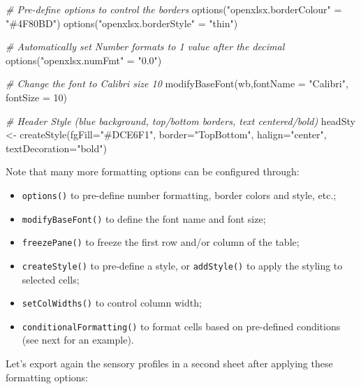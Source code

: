 \documentclass[
]{krantz}
\makeatletter
\newenvironment{Shaded}{\begin{snugshade}}{\end{snugshade}}
\newcommand{\AttributeTok}[1]{\textcolor[rgb]{0.61,0.61,0.61}{#1}}
\newcommand{\CommentTok}[1]{\textcolor[rgb]{0.37,0.37,0.37}{\textit{#1}}}
\newcommand{\DecValTok}[1]{\textcolor[rgb]{0.06,0.06,0.06}{#1}}
\newcommand{\FunctionTok}[1]{\textcolor[rgb]{0,0,0}{#1}}
\newcommand{\NormalTok}[1]{#1}
\newcommand{\OtherTok}[1]{\textcolor[rgb]{0.37,0.37,0.37}{#1}}
\newcommand{\StringTok}[1]{\textcolor[rgb]{0.5,0.5,0.5}{#1}}
\providecommand{\tightlist}{%
  \setlength{\itemsep}{0pt}\setlength{\parskip}{0pt}}
\newenvironment{kframe}{%
\medskip{}
\setlength{\fboxsep}{.8em}
 \def\at@end@of@kframe{}%
 \ifinner\ifhmode%
  \def\at@end@of@kframe{\end{minipage}}%
  \begin{minipage}{\columnwidth}%
 \fi\fi%
 \def\FrameCommand##1{\hskip\@totalleftmargin \hskip-\fboxsep
 \colorbox{shadecolor}{##1}\hskip-\fboxsep
     \hskip-\linewidth \hskip-\@totalleftmargin \hskip\columnwidth}%
 \MakeFramed {\advance\hsize-\width
   \@totalleftmargin\z@ \linewidth\hsize
   \@setminipage}}%
 {\par\unskip\endMakeFramed%
 \at@end@of@kframe}
\renewenvironment{Shaded}{\begin{kframe}}{\end{kframe}}
\makeatother
\begin{document}
\begin{Shaded}
\begin{Highlighting}[]
\CommentTok{\# Pre{-}define options to control the borders }
\FunctionTok{options}\NormalTok{(}\StringTok{"openxlsx.borderColour"} \OtherTok{=} \StringTok{"\#4F80BD"}\NormalTok{)}
\FunctionTok{options}\NormalTok{(}\StringTok{"openxlsx.borderStyle"} \OtherTok{=} \StringTok{"thin"}\NormalTok{)}

\CommentTok{\# Automatically set Number formats to 1 value after the decimal}
\FunctionTok{options}\NormalTok{(}\StringTok{"openxlsx.numFmt"} \OtherTok{=} \StringTok{"0.0"}\NormalTok{)}

\CommentTok{\# Change the font to Calibri size 10}
\FunctionTok{modifyBaseFont}\NormalTok{(wb,}\AttributeTok{fontName =} \StringTok{"Calibri"}\NormalTok{, }\AttributeTok{fontSize =} \DecValTok{10}\NormalTok{)}

\CommentTok{\# Header Style (blue background, top/bottom borders, text centered/bold)}
\NormalTok{headSty }\OtherTok{\textless{}{-}} \FunctionTok{createStyle}\NormalTok{(}\AttributeTok{fgFill=}\StringTok{"\#DCE6F1"}\NormalTok{, }\AttributeTok{border=}\StringTok{"TopBottom"}\NormalTok{, }\AttributeTok{halign=}\StringTok{"center"}\NormalTok{, }\AttributeTok{textDecoration=}\StringTok{"bold"}\NormalTok{)}
\end{Highlighting}
\end{Shaded}

Note that many more formatting options can be configured through:

\begin{itemize}
\tightlist
\item
  \texttt{options()} to pre-define number formatting, border colors and style, etc.;
\item
  \texttt{modifyBaseFont()} to define the font name and font size;
\item
  \texttt{freezePane()} to freeze the first row and/or column of the table;
\item
  \texttt{createStyle()} to pre-define a style, or \texttt{addStyle()} to apply the styling to selected cells;
\item
  \texttt{setColWidths()} to control column width;
\item
  \texttt{conditionalFormatting()} to format cells based on pre-defined conditions (see next for an example).
\end{itemize}

Let's export again the sensory profiles in a second sheet after applying these formatting options:
\end{document}
